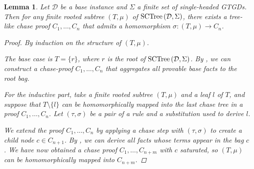 \documentclass[12pt]{report}
\theoremstyle{plain}
\newtheorem{lemma}[theorem]{Lemma}
\theoremstyle{definition}
\newcommand{\SCTree}[2]{\ensuremath{\normalfont{\textrm{SCTree}} \left( #1, #2 \right)}}
\begin{document}
\begin{lemma}
\label{sctree-subtree-embeds-into-a-chase-proof}
  Let $\mathcal{D}$ be a base instance and $\Sigma$ a finite set of single-headed GTGDs. Then for any finite rooted subtree $(T, \mu)$ of $\SCTree{\mathcal{D}}{\Sigma}$, there exists a tree-like chase proof $C_1, \ldots, C_n$ that admits a homomorphism $\sigma: (T, \mu) \rightarrow C_n$.
  \begin{proof}
    By induction on the structure of $(T, \mu)$.

    The base case is $T = \{r\}$, where $r$ is the root of $\SCTree{\mathcal{D}}{\Sigma}$. By , we can construct a chase-proof $C_1, \ldots, C_n$ that aggregates all provable base facts to the root bag.

    For the inductive part, take a finite rooted subtree $(T, \mu)$ and a leaf $l$ of $T$, and suppose that $T \setminus \{l\}$ can be homomorphically mapped into the last chase tree in a proof $C_1, \ldots, C_n$. Let $(\tau, \sigma)$ be a pair of a rule and a substitution used to derive $l$.
    
    We extend the proof $C_1, \ldots, C_n$ by applying a chase step with $(\tau, \sigma)$ to create a child node $c \in C_{n+1}$. By , we can derive all facts whose terms appear in the bag $c$. We have now obtained a chase proof $C_1, \ldots, C_{n+m}$ with $c$ saturated, so $(T, \mu)$ can be homomorphically mapped into $C_{n+m}$.
  \end{proof}
\end{lemma}
\end{document}
